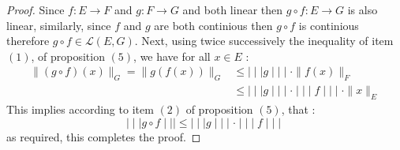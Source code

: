  \begin{proof}
 Since $ f : E \longrightarrow F $ and 
 $ g : F \longrightarrow G $ and both linear then 
 $ g \circ f : E \longrightarrow G $ is also linear, similarly,
 since $f$ and $g$ are both continious then $g \circ f$ is continious
 therefore $g \circ f \in \mathcal{L} \left( E,G \right)$. Next, 
using twice successively the inequality of item $(1) $, of proposition
$(5) $, we have for all $x \in E$ :
\begin{align*}
\| \left( g \circ f \right)(x)  \| _{G} =
\| g \left( f(x)  \right) \|_{G} & \leq 
\mid \mid \mid  g \mid \mid \mid  
\cdot \| f(x)  \| _{F} \\
				 & \leq 
				 \mid \mid \mid  g \mid \mid \mid 
				 \cdot 
				 \mid \mid \mid  f \mid \mid \mid  
				 \cdot 
				 \| x \| _{E}
\end{align*}
This implies according to item $(2)$ of proposition $(5)$, that :  
\[
\mid \mid \mid  g \circ f \mid \mid \mid  
\leq 
\mid \mid \mid  g \mid \mid \mid 
\cdot 
\mid \mid \mid  f \mid \mid \mid 
\]
as required, this completes the proof.
 \end{proof}
% 
